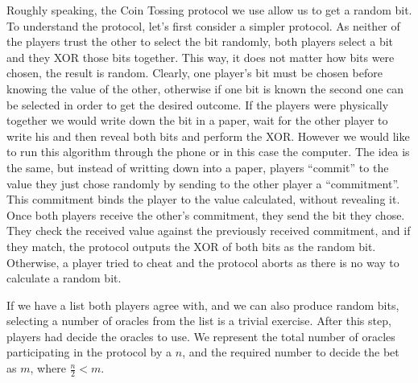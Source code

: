 Roughly speaking, the Coin Tossing protocol we use allow us to get a random bit.
To understand the protocol, let's first consider a simpler protocol.
As neither of the players trust the other to select the bit randomly, both
  players select a bit and they XOR those bits together.
This way, it does not matter how bits were chosen, the result is random.
Clearly, one player's bit must be chosen before knowing the value of  the other,
  otherwise if one bit is known the second one can be selected in order to get
  the desired outcome.
If the players were physically together we would write down the bit in a paper,
  wait for the other player to write his and then reveal both bits and perform
  the XOR\@.
However we would like to run this algorithm through the phone or in this case
  the computer.
The idea is the same, but instead of writting down into a paper, players
  ``commit'' to the value they just chose randomly by sending to the other
  player a ``commitment''.
This commitment binds the player to the value calculated, without revealing it.
Once both players receive the other's commitment, they send the bit they chose.
They check the received value against the previously received commitment, and if
  they match, the protocol outputs the XOR of both bits as the random bit.
Otherwise, a player tried to cheat and the protocol aborts as there is no way to
  calculate a random bit.

If we have a list both players agree with, and we can also produce random bits,
  selecting a number of oracles from the list is a trivial exercise.
After this step, players had decide the oracles to use.
We represent the total number of oracles participating in the protocol by a $n$,
  and the required number to decide the bet as $m$, where $\frac{n}{2} < m$.
